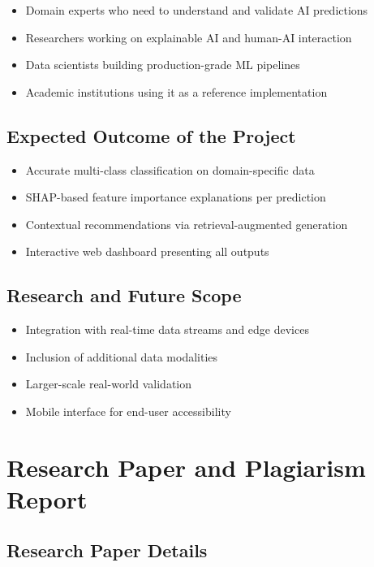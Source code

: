 \documentclass[12pt,a4paper]{report}
\begin{document}
\begin{itemize}
    \item Domain experts who need to understand and validate AI predictions
    \item Researchers working on explainable AI and human-AI interaction
    \item Data scientists building production-grade ML pipelines
    \item Academic institutions using it as a reference implementation
\end{itemize}

\section{Expected Outcome of the Project}

\begin{itemize}
    \item Accurate multi-class classification on domain-specific data
    \item SHAP-based feature importance explanations per prediction
    \item Contextual recommendations via retrieval-augmented generation
    \item Interactive web dashboard presenting all outputs
\end{itemize}

\section{Research and Future Scope}

\begin{itemize}
    \item Integration with real-time data streams and edge devices
    \item Inclusion of additional data modalities
    \item Larger-scale real-world validation
    \item Mobile interface for end-user accessibility
\end{itemize}

\chapter{Research Paper and Plagiarism Report}

\section{Research Paper Details}
\end{document}
